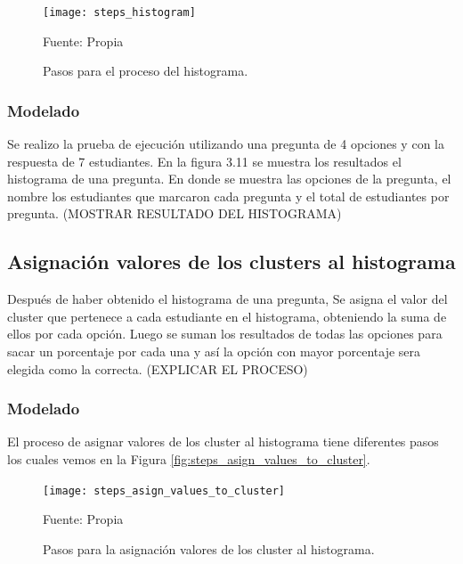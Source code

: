 \begin{figure}[ht]
	\begin{center}
		\texttt{[image: steps\_histogram]}
	\end{center}
	\begin{center}
		\vskip -0.5cm
		\caption{\small{Pasos para el proceso del histograma.}}
		{\small{Fuente: Propia}}
	\end{center}
\end{figure}

\subsubsection{Modelado}

Se realizo la prueba de ejecución utilizando una pregunta de 4 opciones y con la respuesta de 7 estudiantes. En la figura 3.11 se muestra los resultados el histograma de una pregunta. En donde se muestra las opciones de la pregunta, el nombre los estudiantes que marcaron cada pregunta y el total de estudiantes por pregunta.
(MOSTRAR RESULTADO DEL HISTOGRAMA)

\subsection{Asignación valores de los clusters al histograma}

Después de haber obtenido el histograma de una pregunta, Se asigna el valor del cluster que pertenece a cada estudiante en el histograma, obteniendo la suma de ellos por cada opción. Luego se suman los resultados de todas las opciones para sacar un porcentaje por cada una y así la opción con mayor porcentaje sera elegida como la correcta. (EXPLICAR EL PROCESO)

\subsubsection{Modelado}

El proceso de asignar valores de los cluster al histograma tiene diferentes pasos los cuales vemos en la Figura \ref{fig:steps_asign_values_to_cluster}.

\begin{figure}[ht]
	\begin{center}
		\texttt{[image: steps\_asign\_values\_to\_cluster]}
	\end{center}
	\begin{center}
		\vskip -0.5cm
		\caption{\small{Pasos para la asignación valores de los cluster al histograma.}}
		{\small{Fuente: Propia}}
	\end{center}
\end{figure}

